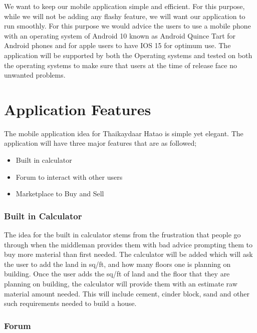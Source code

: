 \documentclass[12pt]{report}
\begin{document}
We want to keep our mobile application simple and efficient. For this purpose, while we will not be adding any flashy feature, we will want our application to run smoothly. For this purpose we would advice the users to use a mobile phone with an operating system of Android 10 known as Android Quince Tart for Android phones and for apple users to have IOS 15 for optimum use. The application will be supported by both the Operating systems and tested on both the operating systems to make sure that users at the time of release face no unwanted problems. 

\section*{Application Features}

The mobile application idea for Thaikaydaar Hatao is simple yet elegant. The application will have three major features that are as followed;

\begin{itemize}

        \item Built in calculator 
        \item Forum to interact with other users
        \item Marketplace to Buy and Sell

\end{itemize}

\subsubsection*{Built in Calculator}

The idea for the built in calculator stems from the frustration that people go through when the middleman provides them with bad advice prompting them to buy more material than first needed. The calculator will be added which will ask the user to add the land in sq/ft, and how many floors one is planning on building. Once the user adds the sq/ft of land and the floor that they are planning on building, the calculator will provide them with an estimate raw material amount needed. This will include cement, cinder block, sand and other such requirements needed to build a house. 


\subsubsection*{Forum}
\end{document}
